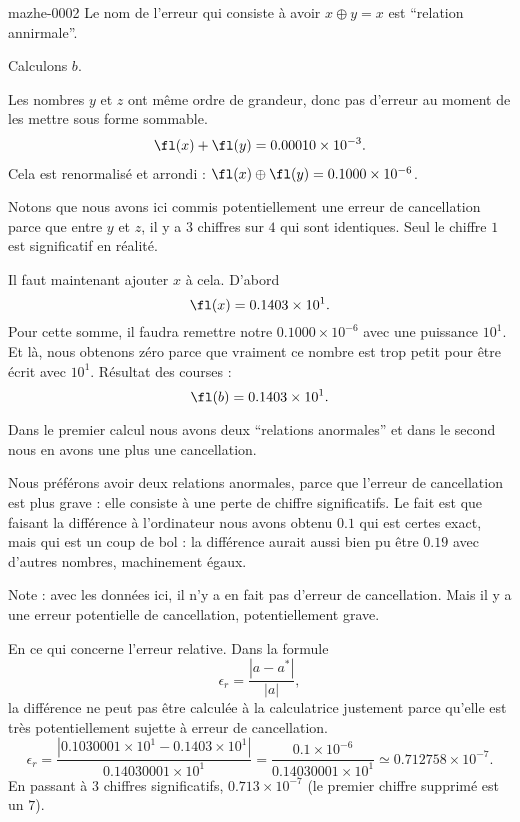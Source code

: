 \begin{corrige}{mazhe-0002}
Le nom de l'erreur qui consiste à avoir \( x\oplus y=x\) est ``relation annirmale''.

Calculons \( b\).

Les nombres \( y\) et \( z\) ont même ordre de grandeur, donc pas d'erreur au moment de les mettre sous forme sommable.
\begin{subequations}
    \begin{align}
        \fl(x)+\fl(y)=0.00010\times 10^{-3}.
    \end{align}
\end{subequations}
Cela est renormalisé et arrondi : \( \fl(x)\oplus\fl(y)=0.1000\times 10^{-6}\).

Notons que nous avons ici commis potentiellement une erreur de cancellation parce que entre \( y\) et \( z\), il y a \( 3\) chiffres sur \( 4\) qui sont identiques. Seul le chiffre \( 1\) est significatif en réalité.

Il faut maintenant ajouter \( x\) à cela. D'abord
\begin{equation}
    \fl(x)=0.1403\times 10^1.
\end{equation}
Pour cette somme, il faudra remettre notre \( 0.1000\times 10^{-6}\) avec une puissance \( 10^1\). Et là, nous obtenons zéro parce que vraiment ce nombre est trop petit pour être écrit avec \( 10^1\). Résultat des courses :
\begin{equation}
    \fl(b)=0.1403\times 10^1.
\end{equation}


Dans le premier calcul nous avons deux ``relations anormales'' et dans le second nous en avons une plus une cancellation.

Nous préférons avoir deux relations anormales, parce que l'erreur de cancellation est plus grave : elle consiste à une perte de chiffre significatifs. Le fait est que faisant la différence à l'ordinateur nous avons obtenu \( 0.1\) qui est certes exact, mais qui est un coup de bol : la différence aurait aussi bien pu être \(0.19\) avec d'autres nombres, machinement égaux.

Note : avec les données ici, il n'y a en fait pas d'erreur de cancellation. Mais il y a une erreur potentielle de cancellation, potentiellement grave.

En ce qui concerne l'erreur relative. Dans la formule
\begin{equation}
    \epsilon_r=\frac{ | a-a^* | }{ | a | },
\end{equation}
la différence ne peut pas être calculée à la calculatrice justement parce qu'elle est très potentiellement sujette à erreur de cancellation.
\begin{equation}
    \epsilon_r=\frac{ | 0.1030001\times 10^1-0.1403\times 10^1 | }{ 0.14030001\times 10^1 }=\frac{ 0.1\times 10^{-6} }{ 0.14030001\times 10^1 }\simeq 0.712758\times 10^{-7}.
\end{equation}
En passant à \( 3\) chiffres significatifs, \( 0.713\times 10^{-7}\) (le premier chiffre supprimé est un \( 7\)).

\end{corrige}
